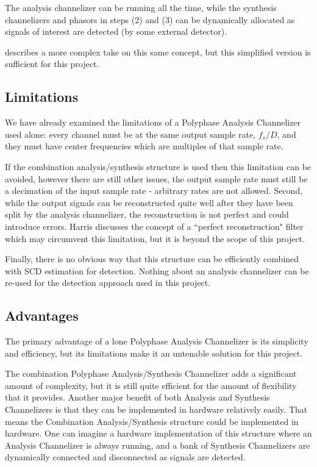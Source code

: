 \documentclass[12pt]{report}
\begin{document}
The analysis channelizer can be running all the time, while the synthesis
channelizers and phasors in steps (2) and (3) can be dynamically allocated as
signals of interest are detected (by some external detector).

\cite{Harris2} describes a more complex take on this same concept, but this
simplified version is sufficient for this project.



\subsection{Limitations}
\label{sec:poly_limitations}
We have already examined the limitations of a Polyphase Analysis
Channelizer used alone: every channel must be at the same output sample
rate, $f_s/D$, and they must have center frequencies which are multiples of
that sample rate.

If the combination analysis/synthesis structure is used then this limitation
can be avoided, however there are still other issues, the output sample
rate must still be a decimation of the input sample rate - arbitrary rates are
not allowed. Second, while the output signals can be reconstructed quite well
after they have been split by the analysis channelizer, the reconstruction is
not perfect and could introduce errors. Harris discusses the concept of
a ``perfect reconstruction" filter \cite{Harris2} which may circumvent this
limitation, but it is beyond the scope of this project.

Finally, there is no obvious way that this structure can be efficiently
combined with SCD estimation for detection. Nothing about an analysis
channelizer can be re-used for the detection approach used in this project.

\subsection{Advantages}
\label{sec:poly_advantages}
The primary advantage of a lone Polyphase Analysis Channelizer is its
simplicity and efficiency, but its limitations make it an untenable solution
for this project.

The combination Polyphase Analysis/Synthesis Channelizer adds a significant
amount of complexity, but it is still quite efficient for the amount of
flexibility that it provides. Another major benefit of both Analysis and
Synthesis Channelizers is that they can be implemented in hardware relatively
easily. That means the Combination Analysis/Synthesis structure could be
implemented in hardware. One can imagine a hardware implementation of this
structure where an Analysis Channelizer is always running, and a bank of
Synthesis Channelizers are dynamically connected and disconnected as signals
are detected.
\end{document}
